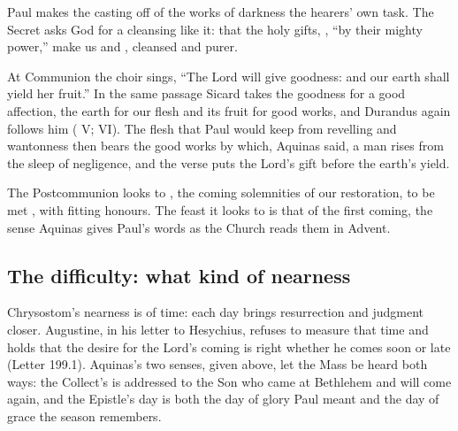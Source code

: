 Paul makes the casting off of the works of darkness the hearers' own task.
The Secret asks God for a cleansing like it: that the
holy gifts, , ``by their mighty power,'' make us
 and , cleansed and purer.

At Communion the choir sings, ``The Lord will give goodness: and our earth
shall yield her fruit.'' In the same passage Sicard takes the goodness for a
good affection, the earth for our flesh and its fruit for good works, and
Durandus again follows him ( V;  VI). The flesh
that Paul would keep from revelling and wantonness then bears the good works
by which, Aquinas said, a man rises from the sleep of negligence, and the
verse puts the Lord's gift before the earth's yield.

The Postcommunion looks to , the
coming solemnities of our restoration, to be met ,
with fitting honours. The feast it looks to is that of the first coming, the
sense Aquinas gives Paul's words as the Church reads them in Advent.

\subsection{The difficulty: what kind of nearness}

Chrysostom's nearness is of time: each day brings resurrection and judgment
closer. Augustine, in his letter to Hesychius, refuses to measure that time
and holds that the desire for the Lord's coming is right whether he comes soon
or late (Letter 199.1). Aquinas's two senses, given above, let the Mass be
heard both ways: the Collect's  is addressed to the Son who came
at Bethlehem and will come again, and the Epistle's day is both the day of
glory Paul meant and the day of grace the season remembers.

